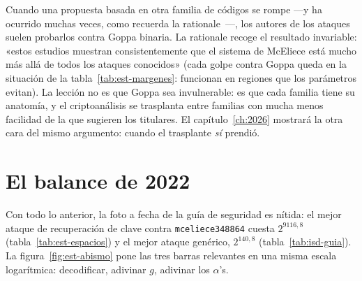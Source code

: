 \documentclass[11pt,a4paper,oneside]{report}
\begin{document}
\begin{trampa}
Cuando una propuesta basada en otra familia de códigos se rompe
---y ha ocurrido muchas veces, como recuerda la
rationale~\cite{cmrationale}---, los autores de los ataques suelen
probarlos contra Goppa binaria. La rationale recoge el resultado
invariable: «estos estudios muestran consistentemente que el sistema
de McEliece está mucho más allá de todos los ataques conocidos»
(cada golpe contra Goppa queda en la situación de la
tabla~\ref{tab:est-margenes}: funcionan en regiones que los
parámetros evitan). La lección no es que Goppa sea invulnerable: es
que cada familia tiene su anatomía, y el criptoanálisis se trasplanta
entre familias con mucha menos facilidad de la que sugieren los
titulares. El capítulo~\ref{ch:2026} mostrará la otra cara del mismo
argumento: cuando el trasplante \emph{sí} prendió.
\end{trampa}

\section{El balance de 2022}\label{sec:est-balance}

Con todo lo anterior, la foto a fecha de la guía de seguridad es
nítida: el mejor ataque de recuperación de clave contra
\texttt{mceliece348864} cuesta $2^{9116{,}8}$ (tabla~\ref{tab:est-espacios})
y el mejor ataque genérico, $2^{140{,}8}$ (tabla~\ref{tab:isd-guia}).
La figura~\ref{fig:est-abismo} pone las tres barras relevantes en una
misma escala logarítmica: decodificar, adivinar $g$, adivinar los
$\alpha$'s.
\end{document}
